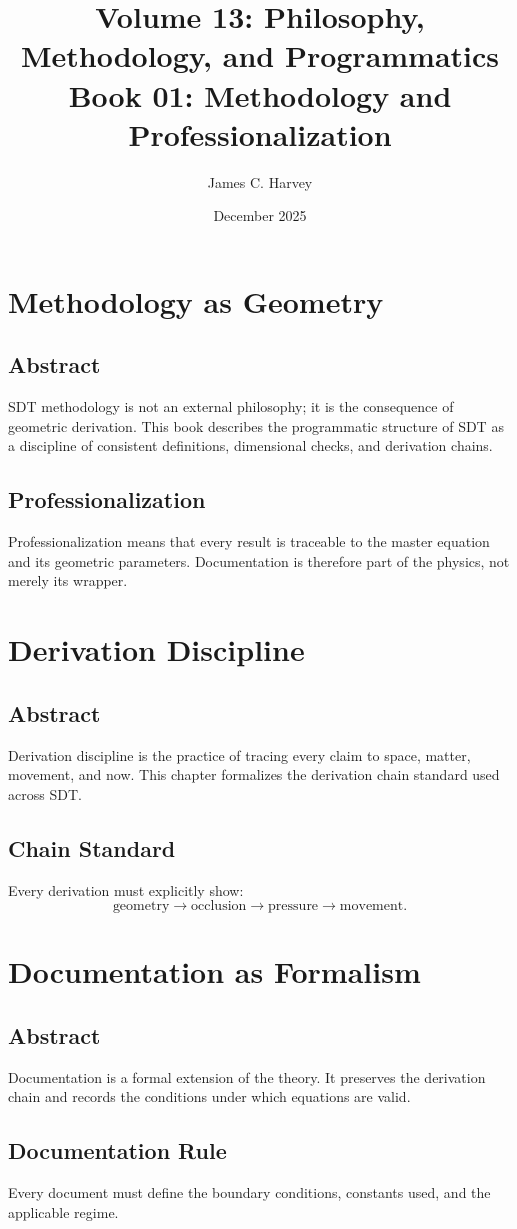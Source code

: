 \documentclass[12pt]{book}
\title{Volume 13: Philosophy, Methodology, and Programmatics \\ Book 01: Methodology and Professionalization}
\author{James C. Harvey}
\date{December 2025}
\begin{document}
\maketitle
\tableofcontents

\chapter{Methodology as Geometry}

\section*{Abstract}
SDT methodology is not an external philosophy; it is the consequence of geometric derivation. This book
describes the programmatic structure of SDT as a discipline of consistent definitions, dimensional checks,
and derivation chains.

\section{Professionalization}
Professionalization means that every result is traceable to the master equation and its geometric
parameters. Documentation is therefore part of the physics, not merely its wrapper.

\chapter{Derivation Discipline}

\section*{Abstract}
Derivation discipline is the practice of tracing every claim to space, matter, movement, and now. This
chapter formalizes the derivation chain standard used across SDT.

\section{Chain Standard}
Every derivation must explicitly show:
\begin{equation}
\text{geometry} \rightarrow \text{occlusion} \rightarrow \text{pressure} \rightarrow \text{movement}.
\end{equation}

\chapter{Documentation as Formalism}

\section*{Abstract}
Documentation is a formal extension of the theory. It preserves the derivation chain and records the
conditions under which equations are valid.

\section{Documentation Rule}
Every document must define the boundary conditions, constants used, and the applicable regime.
\end{document}

